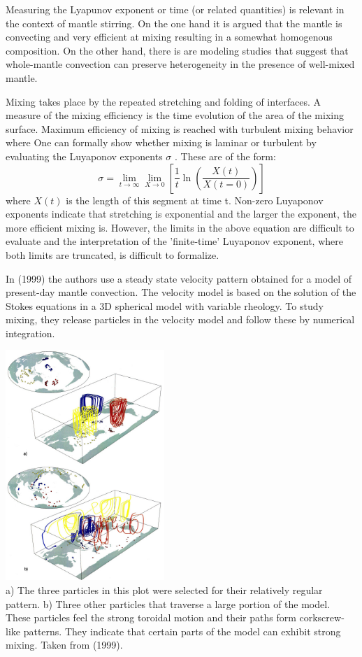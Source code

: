 Measuring the Lyapunov exponent or time (or related quantities) is relevant in the context of mantle stirring. 
On the one hand it is argued that the mantle is convecting and very efficient at mixing resulting in a 
somewhat homogenous composition. On the other hand, there is are modeling studies that suggest that
whole-mantle convection can preserve heterogeneity in the presence of well-mixed mantle. 

Mixing takes place by the repeated stretching
and folding of interfaces. A measure of the
mixing efficiency is the time evolution of the area of
the mixing surface. Maximum efficiency of mixing
is reached with turbulent mixing behavior where
One can formally show whether mixing is laminar or turbulent by evaluating the Luyaponov exponents $\sigma$ .
These are of the form:
\[
\sigma = \lim_{t\rightarrow \infty} \lim_{X\rightarrow 0} \left[  \frac{1}{t} \ln \left( \frac{X(t)}{X(t=0)} \right)   \right]
\]
where $X(t)$ is the length of this segment at time t.
Non-zero Luyaponov exponents indicate that
stretching is exponential and the larger the exponent,
the more efficient mixing is.
However, the limits in the above equation are difficult to evaluate and the interpretation 
of the 'finite-time' Luyaponov exponent, where both limits are truncated, is difficult to formalize.


In \textcite{vazh99} (1999) the authors use a steady state velocity
pattern obtained for a model of present-day mantle convection. The velocity model is
based on the solution of the Stokes equations in a 3D spherical model with variable rheology.
To study mixing, they release particles in the velocity model and follow 
these by numerical integration. 

\begin{center}
\includegraphics[width=6cm]{images/mixing/vazh99}\\
{\captionfont a) The three particles in this plot were
selected for their relatively regular pattern. 
b) Three other particles that traverse a large portion of the model. These particles feel 
the strong toroidal motion and their paths form corkscrew-like patterns. 
They indicate that certain parts of the model can exhibit strong mixing. 
Taken from \textcite{vazh99} (1999).}
\end{center}

